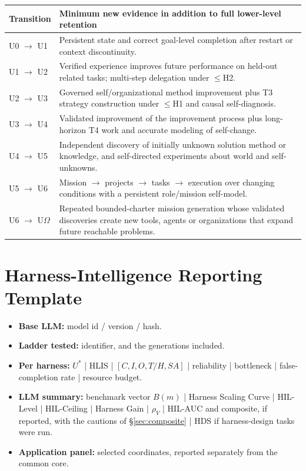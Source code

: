 \documentclass[11pt]{article}
\theoremstyle{definition}
\newcommand{\Om}{\ensuremath{\Omega}}
\newcommand{\rhov}{\ensuremath{\rho_V}}
\begin{document}
\begin{table}[h]
\centering\small
\begin{tabularx}{\textwidth}{@{}lY@{}}
\toprule
Transition & Minimum new evidence in addition to full lower-level retention \\
\midrule
U0 $\to$ U1 & Persistent state and correct goal-level completion after restart or context discontinuity. \\
U1 $\to$ U2 & Verified experience improves future performance on held-out related tasks; multi-step delegation under $\le$H2. \\
U2 $\to$ U3 & Governed self/organizational method improvement plus T3 strategy construction under $\le$H1 and causal self-diagnosis. \\
U3 $\to$ U4 & Validated improvement of the improvement process plus long-horizon T4 work and accurate modeling of self-change. \\
U4 $\to$ U5 & Independent discovery of initially unknown solution method or knowledge, and self-directed experiments about world and self-unknowns. \\
U5 $\to$ U6 & Mission $\to$ projects $\to$ tasks $\to$ execution over changing conditions with a persistent role/mission self-model. \\
U6 $\to$ U\Om{} & Repeated bounded-charter mission generation whose validated discoveries create new tools, agents or organizations that expand future reachable problems. \\
\bottomrule
\end{tabularx}
\end{table}

\section{Harness-Intelligence Reporting Template}

\begin{itemize}
\item \textbf{Base LLM:} model id / version / hash.
\item \textbf{Ladder tested:} identifier, and the generations included.
\item \textbf{Per harness:} $U^{*}$ | HLIS | $[C,I,O,T/H,SA]$ | reliability | bottleneck | false-completion rate | resource budget.
\item \textbf{LLM summary:} benchmark vector $B(m)$ | Harness Scaling Curve | HIL-Level | HIL-Ceiling | Harness Gain | \rhov{} | HIL-AUC and composite, if reported, with the cautions of \S\ref{sec:composite} | HDS if harness-design tasks were run.
\item \textbf{Application panel:} selected coordinates, reported separately from the common core.
\end{itemize}
\end{document}

